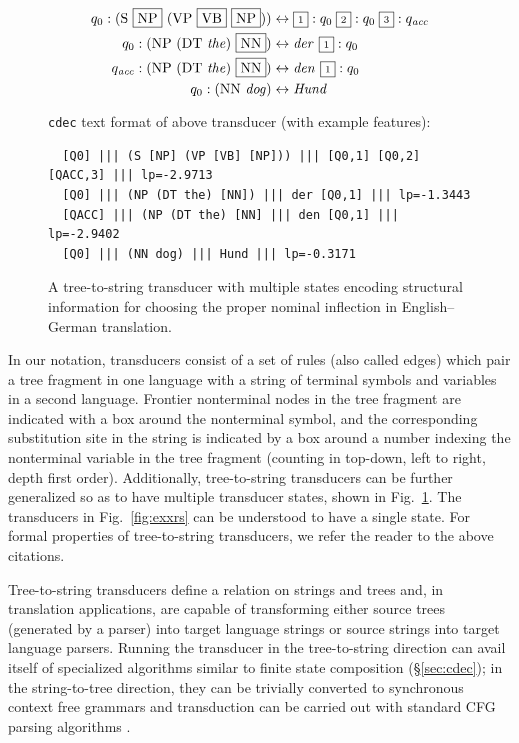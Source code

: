 \documentclass[nofonts]{pbml} %
\begin{document}
\begin{figure}
\begin{small}
\begin{align*}
q_0 : \textrm{(S \fbox{NP} (VP \fbox{VB} \fbox{NP}))} &\leftrightarrow \scriptsize{\fbox{1}}:q_0\ \scriptsize{\fbox{2}}:q_0\ \scriptsize{\fbox{3}}:q_{\textrm{\emph{acc}}} \\
q_0 : \textrm{(NP (DT \emph{the}) \fbox{NN})} &\leftrightarrow \textrm{\emph{der }}  \scriptsize{\fbox{1}}:q_0 \\
q_{\textrm{\emph{acc}}} : \textrm{(NP (DT \emph{the}) \fbox{NN})} &\leftrightarrow \textrm{\emph{den }}  \scriptsize{\fbox{1}}:q_0 \\
q_0 : \textrm{(NN \emph{dog})} &\leftrightarrow \textrm{\emph{Hund}}
\end{align*}
\end{small}
{\tt cdec} text format of above transducer (with example features):
\begin{small}
\begin{verbatim}
  [Q0] ||| (S [NP] (VP [VB] [NP])) ||| [Q0,1] [Q0,2] [QACC,3] ||| lp=-2.9713
  [Q0] ||| (NP (DT the) [NN]) ||| der [Q0,1] ||| lp=-1.3443
  [QACC] ||| (NP (DT the) [NN] ||| den [Q0,1] ||| lp=-2.9402
  [Q0] ||| (NN dog) ||| Hund ||| lp=-0.3171
\end{verbatim}
\end{small}
\caption{\label{fig:multistate}A tree-to-string transducer with multiple states encoding structural information for choosing the proper nominal inflection in English--German translation.}
\end{figure}
In our notation, transducers consist of a set of rules (also called edges) which pair a tree fragment in one language with a string of terminal symbols and variables in a second language. Frontier nonterminal nodes in the tree fragment are indicated with a box around the nonterminal symbol, and the corresponding substitution site in the string is indicated by a box around a number indexing the nonterminal variable in the tree fragment (counting in top-down, left to right, depth first order). Additionally, tree-to-string transducers can be further generalized so as to have multiple transducer states, shown in Fig.~\ref{fig:multistate}. The transducers in Fig.~\ref{fig:exxrs} can be understood to have a single state. For formal properties of tree-to-string transducers, we refer the reader to the above citations. 

Tree-to-string transducers define a relation on strings and trees and, in translation applications, are capable of transforming either source trees (generated by a parser) into target language strings or source strings into target language parsers. Running the transducer in the tree-to-string direction can avail itself of specialized algorithms similar to finite state composition (\S\ref{sec:cdec}); in the string-to-tree direction, they can be trivially converted to synchronous context free grammars and transduction can be carried out with standard CFG parsing algorithms \citep{Galley2004}.
\end{document}
